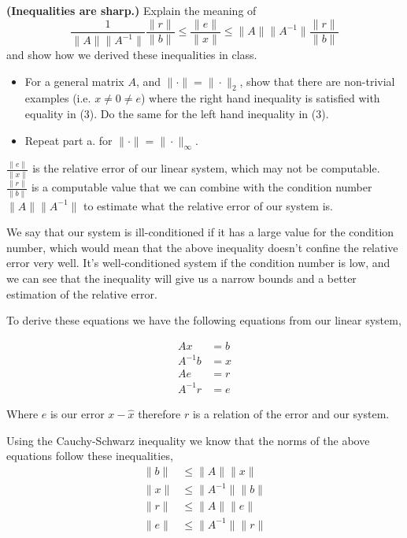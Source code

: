 \textbf{(Inequalities are sharp.)} Explain the meaning of \[
\frac{1} {\|A\| \|A^{-1}\|}
\frac{\|r\|} {\|b\|}
\le
\frac{\|e\|}{\|x\|}
\le
\|A\| \|A^{-1}\|
\frac{\|r\|} {\|b\|}
\] and show how we derived these inequalities in class.

\begin{itemize}
\item For a general matrix $A$, and $\| \cdot \| = \| \cdot \|_2$,
  show that there are non-trivial examples (i.e. $x \ne 0 \ne e$)
  where the right hand inequality is satisfied with equality in (3).
  Do the same for the left hand inequality in (3).
\item Repeat part a. for $\| \cdot \| = \| \cdot \|_\infty$.
\end{itemize}

{\color{blue}

$\frac{\| e \|}{\| x \|}$ is the relative error of our linear system,
which may not be computable.
$\frac{\| r \|}{\| b \|}$ is a computable value that we can combine
with the condition number $\| A \| \| A^{-1} \|$ to estimate what the
relative error of our system is.

We say that our system is ill-conditioned if it has a large value for
the condition number, which would mean that the above inequality
doesn't confine the relative error very well. It's well-conditioned
system if the condition number is low, and we can see that the
inequality will give us a narrow bounds and a better estimation of the
relative error.

To derive these equations we have the following equations from our
linear system,

\begin{align*}
Ax &= b \\
A^{-1}b &= x \\
Ae &= r \\
A^{-1}r &= e
\end{align*}

Where $e$ is our error $x - \hat{x}$ therefore $r$ is a relation of
the error and our system.

Using the Cauchy-Schwarz inequality we know that the norms of the
above equations follow these inequalities,
\begin{align*}
\| b \| &\le \| A \| \| x \| \\
\| x \| &\le \| A^{-1} \| \| b \| \\
\| r \| &\le \| A \| \| e \| \\
\| e \| &\le \| A^{-1} \| \| r \| \\
\end{align*}

}
